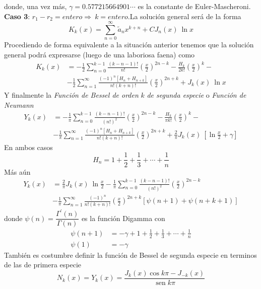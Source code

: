 \documentclass[spanish,notitlepage,letterpaper,12pt]{article}
\begin{document}
donde, una vez m\'{a}s, $\gamma=0.577215664901\cdots$ es la constante de
Euler-Mascheroni. \newline \textbf{Caso 3}: $r_{1}-r_{2}=entero\Rightarrow
\ k=entero.$\newline La soluci\'{o}n general ser\'{a} de la forma
\[
K_{k}(x)=\sum_{n=0}^{\infty}\tilde{a}_{n}x^{k+n}+CJ_{n}(x)\ \ln x
\]
Procediendo de forma equivalente a la situaci\'{o}n anterior tenemos que la
soluci\'{o}n general podr\'{a} expresarse (luego de una laboriosa faena) como
\begin{align*}
K_{k}(x)  & =-\frac12\sum_{n=0}^{k-1}\frac{\left(  k-n-1\right)  !}{n!}\left(
\frac x2\right)  ^{2n-k}-\frac{H_{k}}{2k!}\left(  \frac x2\right)  ^{k}-\\
& -\frac12\sum_{n=1}^{\infty}\frac{\left(  -1\right)  ^{n}\left[
H_{n}+H_{n+k}\right]  }{n!\left(  k+n\right)  !}\left(  \frac x2\right)
^{2n+k}+J_{k}(x)\ \ln x
\end{align*}
Y finalmente la \textit{Funci\'{o}n de Bessel de orden }$k$ \textit{de segunda
especie} o \textit{Funci\'{o}n de Neumann}
\begin{align*}
Y_{k}(x)  & =-\frac1\pi\sum_{n=0}^{k-1}\frac{\left(  k-n-1\right)  !}{\left(
n!\right)  ^{2}}\left(  \frac x2\right)  ^{2n-k}-\frac{H_{k}}{\pi k!}\left(
\frac x2\right)  ^{k}-\\
& -\frac1\pi\sum_{n=1}^{\infty}\frac{\left(  -1\right)  ^{n}\left[
H_{n}+H_{n+k}\right]  }{n!\left(  k+n\right)  !}\left(  \frac x2\right)
^{2n+k}+\frac2\pi J_{k}(x)\ \left[  \ln\frac x2+\gamma\right]
\end{align*}
En ambos casos
\[
H_{n}=1+\frac12+\frac13+\cdots+\frac1n
\]
M\'{a}s a\'{u}n
\begin{align*}
Y_{k}(x)  & =\frac2\pi J_{k}(x)\ \ln\frac x2-\frac1\pi\sum_{n=0}^{k-1}%
\frac{\left(  k-n-1\right)  !}{\left(  n!\right)  ^{2}}\left(  \frac
x2\right)  ^{2n-k}\\
& -\frac1\pi\sum_{n=1}^{\infty}\frac{\left(  -1\right)  ^{n}}{n!\left(
k+n\right)  !}\left(  \frac x2\right)  ^{2n+k}\left[  \psi(n+1)+\psi
(n+k+1)\right]
\end{align*}
donde $\psi(n)=\dfrac{\Gamma^{\prime}(n)}{\Gamma(n)}$ es la funci\'{o}n
Digamma con
\begin{align*}
\psi(n+1)  & =-\gamma+1+\frac12+\frac13+\cdots+\frac1n\\
\psi(1)  & =-\gamma
\end{align*}
Tambi\'{e}n es costumbre definir la funci\'{o}n de Bessel de segunda especie
en terminos de las de primera especie
\[
N_{k}(x)=Y_{k}(x)=\frac{J_{k}(x)\cos k\pi-J_{-k}(x)}{\operatorname*{sen}k\pi}
\]
\end{document}
